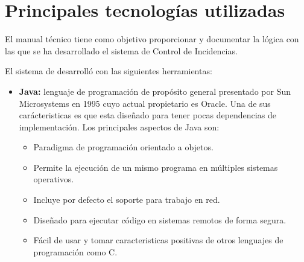 

\section{Principales tecnologías utilizadas}

El manual técnico tiene como objetivo proporcionar y documentar la lógica con las que se ha desarrollado el sistema de Control de Incidencias.

El sistema de desarrolló con las siguientes herramientas:
\begin{itemize}
    \item \textbf{Java:} lenguaje de programación de propósito general presentado por Sun Microsystems en 1995 cuyo actual propietario es Oracle. Una de sus carácteristicas es que esta diseñado para tener pocas dependencias de implementación. Los principales aspectos de Java son:
        \begin{itemize}
            \item Paradigma de programación orientado a objetos.
            \item Permite la ejecución de un mismo programa en múltiples sistemas operativos.
            \item Incluye por defecto el soporte para trabajo en red.
            \item Diseñado para ejecutar código en sistemas remotos de forma segura.
            \item Fácil de usar y tomar caracteristicas positivas de otros lenguajes de programación como C.
        \end{itemize}
        

\end{itemize}
